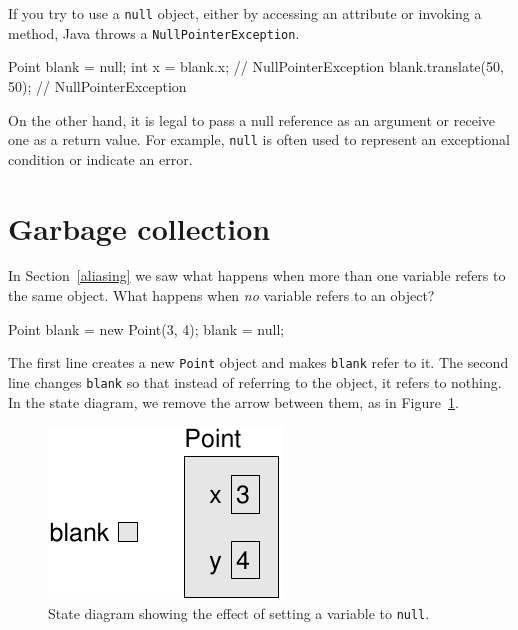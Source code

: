 \documentclass[12pt]{book}
\theoremstyle{exercise}
\newcommand{\java}[1]{\verb"#1"}
\begin{document}

If you try to use a \java{null} object, either by accessing an attribute or invoking a method, Java throws a \java{NullPointerException}.

\begin{code}
    Point blank = null;
    int x = blank.x;              // NullPointerException
    blank.translate(50, 50);      // NullPointerException
\end{code}

On the other hand, it is legal to pass a null reference as an argument or receive one as a return value.
For example, \java{null} is often used to represent an exceptional condition or indicate an error.


\section{Garbage collection}

In Section~\ref{aliasing} we saw what happens when more than one variable refers to the same object.
What happens when {\em no} variable refers to an object?

\begin{code}
    Point blank = new Point(3, 4);
    blank = null;
\end{code}

The first line creates a new \java{Point} object and makes \java{blank} refer to it.
The second line changes \java{blank} so that instead of referring to the object, it refers to nothing.
In the state diagram, we remove the arrow between them, as in Figure~\ref{fig.reference3}.

\begin{figure}
\begin{center}
\includegraphics{figs/reference3.pdf}
\caption{State diagram showing the effect of setting a variable to \java{null}.}
\label{fig.reference3}
\end{center}
\end{figure}
\end{document}
